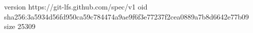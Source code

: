version https://git-lfs.github.com/spec/v1
oid sha256:3a5934d56fd950ca59c784474a9ae9f6f3e77237f2cea0889a7b8d6642e77b09
size 25309
